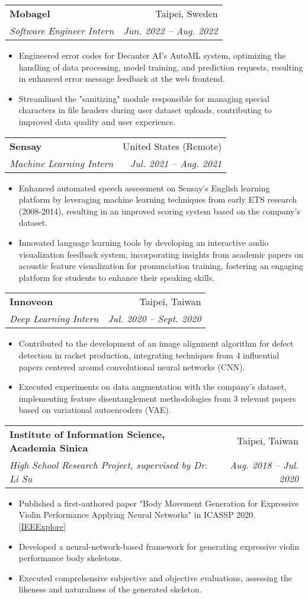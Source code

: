 \documentclass[letterpaper,11pt]{article}
\makeatletter
\newcommand{\resumeItem}[1]{
  \item\small{#1}
}
\newcommand{\resumeSubheading}[4]{
  \vspace{-1pt}\item
    \begin{tabular*}{0.97\textwidth}[t]{l@{\extracolsep{\fill}}r}
      \textbf{#1} & #2 \\
      \textit{\small#3} & \textit{\small #4} \\
    \end{tabular*}\vspace{-5pt}
}
\newcommand{\resumeItemListStart}{\begin{itemize}}
\newcommand{\resumeItemListEnd}{\end{itemize}\vspace{-5pt}}
\makeatother
\begin{document}
    \resumeSubheading
      {Mobagel}{Taipei, Sweden}
      {Software Engineer Intern}{Jun. 2022 -- Aug. 2022}
      \resumeItemListStart
        \resumeItem{}{Engineered error codes for Decanter AI's AutoML system, optimizing the handling of data processing, model training, and prediction requests, resulting in enhanced error message feedback at the web frontend.}
        \resumeItem{}{Streamlined the "sanitizing" module responsible for managing special characters in file headers during user dataset uploads, contributing to improved data quality and user experience.}
      \resumeItemListEnd

    \resumeSubheading
      {Sensay}{United States (Remote)}
      {Machine Learning Intern}{Jul. 2021 -- Aug. 2021}
      \resumeItemListStart
        \resumeItem{}{Enhanced automated speech assessment on Sensay's English learning platform by leveraging machine learning techniques from early ETS research (2008-2014), resulting in an improved scoring system based on the company's dataset.}
        \resumeItem{}{Innovated language learning tools by developing an interactive audio visualization feedback system, incorporating insights from academic papers on acoustic feature visualization for pronunciation training, fostering an engaging platform for students to enhance their speaking skills.}
      \resumeItemListEnd
    
      \resumeSubheading
        {Innoveon}{Taipei, Taiwan}
        {Deep Learning Intern}{Jul. 2020 -- Sept. 2020}
        \resumeItemListStart
          \resumeItem{}{Contributed to the development of an image alignment algorithm for defect detection in racket production, integrating techniques from 4 influential papers centered around convolutional neural networks (CNN).}
          \resumeItem{}{Executed experiments on data augmentation with the company's dataset, implementing feature disentanglement methodologies from 3 relevant papers based on variational autoencoders (VAE).}
        \resumeItemListEnd
      
        \resumeSubheading
          {Institute of Information Science, Academia Sinica}{Taipei, Taiwan}
          {High School Research Project, supervised by Dr. Li Su} {Aug. 2018 -- Jul. 2020}
          \resumeItemListStart
            \resumeItem{}{Published a first-authored paper "Body Movement Generation for Expressive Violin Performance Applying Neural Networks" in ICASSP 2020. [\href{https://ieeexplore.ieee.org/document/9054463}{IEEExplore}]}
            \resumeItem{}{Developed a neural-network-based framework for generating expressive violin performance body skeletons.}
            \resumeItem{}{Executed comprehensive subjective and objective evaluations, assessing the likeness and naturalness of the generated skeleton.}
          \resumeItemListEnd
          
\end{document}
